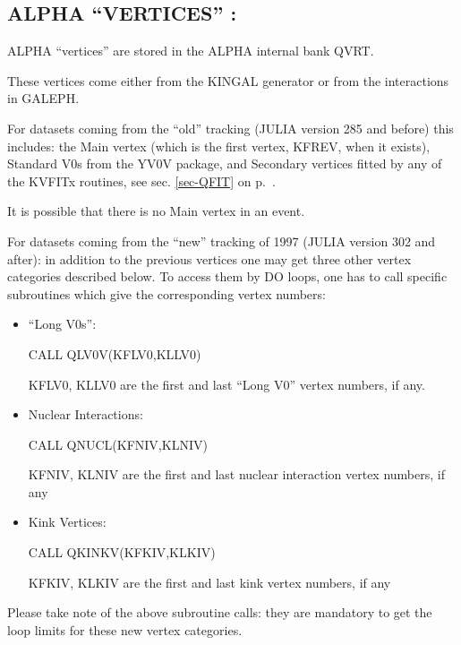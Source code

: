 \subsection{\label{sec-alvert}ALPHA ``VERTICES'' :}
\par

         ALPHA  ``vertices'' are stored in the ALPHA internal bank QVRT.

\begin{indentlist}{ 2.00cm}{ 2.25cm}


            These vertices come either from the  KINGAL generator or from the
 interactions in GALEPH.  


For datasets coming from the ``old'' tracking (JULIA version 285 and before) 
 this includes:  the Main
vertex (which is the first vertex, KFREV, when it exists),
Standard V0s from the YV0V
package, and Secondary vertices fitted by any of the KVFITx routines, see sec.
\ref{sec-QFIT} on p.~\pageref{sec-QFIT}.

It is possible that there is no Main vertex in an event.

For datasets coming from the ``new'' tracking of 1997
(JULIA version 302 and after):
 in addition to the previous vertices one may get three
 other vertex categories described below.
 To access them  by DO loops, one has
 to call specific subroutines which give the corresponding vertex numbers:

\begin{itemize}
\item ``Long V0s'': 

                     CALL QLV0V(KFLV0,KLLV0)
 
                     KFLV0, KLLV0 are the first and last ``Long V0'' vertex 
                     numbers, if any.

\item Nuclear Interactions:

                     CALL QNUCL(KFNIV,KLNIV)

                     KFNIV, KLNIV are the first and last nuclear interaction
                     vertex numbers, if any


\item Kink Vertices:

                     CALL QKINKV(KFKIV,KLKIV)

                     KFKIV, KLKIV are the first and last kink                  
                     vertex numbers, if any
  


\end{itemize}

    Please take note of the above subroutine calls: they are mandatory to get
the loop limits for these new vertex categories.

\end{indentlist}
 
